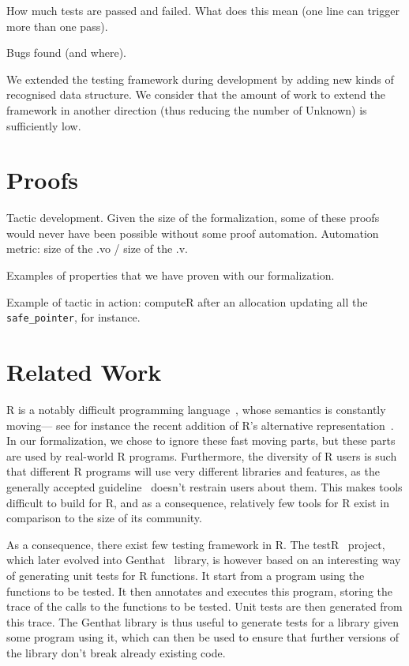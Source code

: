 \documentclass[
    sigplan,
    10pt,
    review, %
    natbib=false %
 ]{acmart}
\begin{document}
How much tests are passed and failed.
What does this mean (one line can trigger more than one pass).

Bugs found (and where).

We extended the testing framework during development by adding new kinds of recognised
data structure.
We consider that the amount of work to extend the framework in another direction
(thus reducing the number of Unknown) is sufficiently low.

\section{Proofs}
\label{sec:proofs}

Tactic development.
Given the size of the formalization, some of these proofs would never have been possible
without some proof automation.
Automation metric: size of the .vo / size of the .v.

Examples of properties that we have proven with our formalization.

Example of tactic in action:
computeR after an allocation updating all the \texttt{safe_pointer}, for instance.

\section{Related Work}
\label{sec:related:work}

R is a notably difficult programming language~\parencite{RInferno},
whose semantics is constantly moving---%
see for instance the recent addition
of R's alternative representation~\parencite{altrepR}.
In our formalization, we chose to ignore these fast moving parts,
but these parts are used by real-world R programs.
Furthermore, the diversity of R users is such that different R programs
will use very different libraries and features,
as the generally accepted guideline~\parencite{RGuidelines}
doesn't restrain users about them.
This makes tools difficult to build for R,
and as a consequence, relatively few tools for R exist
in comparison to the size of its community.

As a consequence,
there exist few testing framework in R.
The testR~\parencite{maj2013testr, 2014testr} project,
which later evolved into Genthat~\parencite{genthat} library,
is however based on an interesting way of generating unit tests for R functions.
It start from a program using the functions to be tested.
It then annotates and executes this program,
storing the trace of the calls to the functions to be tested.
Unit tests are then generated from this trace.
The Genthat library is thus useful to generate tests for a library
given some program using it,
which can then be used to ensure that further versions of the library
don't break already existing code.
\end{document}
